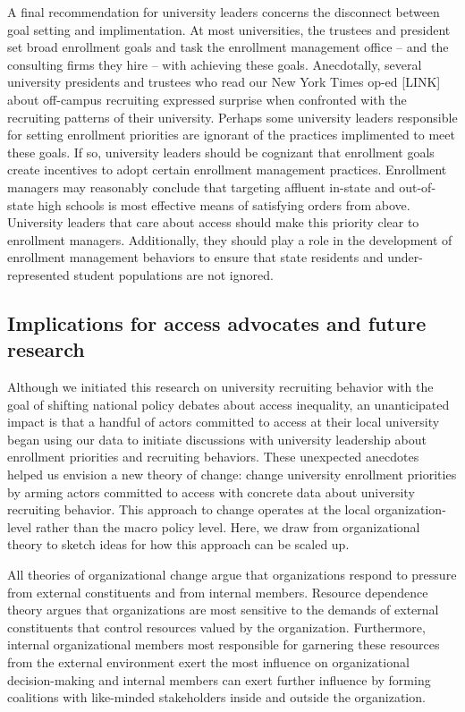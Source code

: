 \documentclass[twoside]{article}
\begin{document}
A final recommendation for university leaders concerns the disconnect between goal setting and implimentation.  At most universities, the trustees and president set broad enrollment goals and task the enrollment management office -- and the consulting firms they hire -- with achieving these goals. Anecdotally, several university presidents and trustees who read our New York Times op-ed [LINK] about off-campus recruiting expressed surprise when confronted with the recruiting patterns of their university.  Perhaps some university leaders responsible for setting enrollment priorities are ignorant of the practices implimented to meet these goals.  If so, university leaders should be cognizant that enrollment goals create incentives to adopt certain enrollment management practices. Enrollment managers may reasonably conclude that targeting affluent in-state and out-of-state high schools is most effective means of satisfying orders from above.  University leaders that care about access should make this priority clear to enrollment managers. Additionally, they should play a role in the development of enrollment management behaviors to ensure that state residents and under-represented student populations are not ignored.


\subsection*{Implications for access advocates and future research}

Although we initiated this research on university recruiting behavior with the goal of shifting national policy debates about access inequality, an unanticipated impact is that a handful of actors committed to access at their local university began using our data to initiate discussions with university leadership about enrollment priorities and recruiting behaviors.  These unexpected anecdotes helped us envision a new theory of change: change university enrollment priorities by arming actors committed to access with concrete data about university recruiting behavior.  This approach to change operates at the local organization-level rather than the macro policy level. Here, we draw from organizational theory to sketch ideas for how this approach can be scaled up.

All theories of organizational change argue that organizations respond to pressure from external constituents and from internal members.  Resource dependence theory \citep{RN959} argues that organizations are most sensitive to the demands of external constituents that control resources valued by the organization.  Furthermore, internal organizational members most responsible for garnering these resources from the external environment exert the most influence on organizational decision-making and internal members can exert further influence by forming coalitions with like-minded stakeholders inside and outside the organization.
\end{document}
